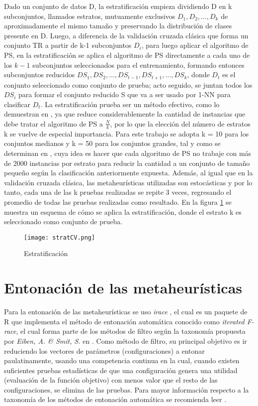 Dado un conjunto de datos D, la estratificación empieza dividiendo D en k subconjuntos, llamados estratos, mutuamente exclusivos $D_1,D_2,\dots,D_k$ de aproximadamente el mismo tamaño y preservando la distribución de clases presente en D. Luego, a diferencia de la validación cruzada clásica que forma un conjunto TR a partir de k-1 subconjuntos $D_i$, para luego aplicar el algoritmo de PS, en la estratificación se aplica el algoritmo de PS directamente a cada uno de los $k-1$ subconjuntos seleccionados para el entrenamiento, formando entonces subconjuntos reducidos $DS_1,DS_2,\dots,DS_{t-1},DS_{t+1},\dots,DS_k$, donde $D_t$ es el conjunto seleccionado como conjunto de prueba; acto seguido, se juntan todos los $DS_i$ para formar el conjunto reducido S que va a ser usado por 1-NN para clasificar $D_t$. La estratificación prueba ser un método efectivo, como lo demuestran en \cite{cano2005stratification}, ya que reduce considerablemente la cantidad de instancias que debe tratar el algoritmo de PS a $\frac{N}{k}$, por lo que la elección del número de estratos k se vuelve de especial importancia. Para este trabajo se adopta k = 10 para los conjuntos medianos y k = 50 para los conjuntos grandes, tal y como se determinan en \cite{cano2005stratification}, cuya idea es hacer que cada algoritmo de PS no trabaje con más de 2000 instancias por estrato para reducir la cantidad a un conjunto de tamaño pequeño según la clasificación anteriormente expuesta. Además, al igual que en la validación cruzada clásica, las metaheurísticas utilizadas son estocásticas y por lo tanto, cada una de las k pruebas realizadas se repite 3 veces, regresando el promedio de todas las pruebas realizadas como resultado. En la figura \ref{strat} se muestra un esquema de cómo se aplica la estratificación, donde el estrato k es seleccionado como conjunto de prueba.

\begin{figure}[]
\centering
\texttt{[image: stratCV.png]}
\caption[Estratificación]{Estratificación}
\label{strat}
\end{figure}

\section{Entonación de las metaheurísticas}

Para la entonación de las metaheurísticas se uso \emph{irace} \cite{lopez2016irace}, el cual es un paquete de R que implementa el método de entonación automática conocido como \emph{iterated F-race}, el cual forma parte de los métodos de filtro según la taxonomía propuesta por \emph{Eiben, A. \& Smit, S.} en \cite{eiben2011parameter}. Como método de filtro, su principal objetivo es ir reduciendo los vectores de parámetros (configuraciones) a entonar paulatinamente, usando una competencia continua en la cual, cuando existen suficientes pruebas estadísticas de que una configuración genera una utilidad (evaluación de la función objetivo) con menos valor que el resto de las configuraciones, se elimina de las pruebas. Para mayor información respecto a la taxonomía de los métodos de entonación automática se recomienda leer \cite{eiben2011parameter}.


